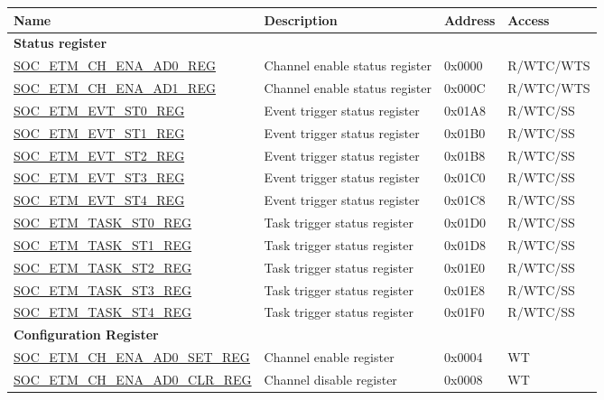 \begin{longtable}{ | p{6cm} | p{6.2cm} | p{1.3cm} | p{2cm} | }
\hline\rowcolor{lightgray}
\textbf{Name} & \textbf{Description} &  \textbf{Address} & \textbf{Access} \\ \hline
\endhead
\multicolumn{4}{|l|}{\textbf{Status register}} \\ \hline
\hyperref[regdesc:SOCETMCHENAAD0REG]{SOC\_ETM\_CH\_ENA\_AD0\_REG} & Channel enable status register & 0x0000 & R/WTC/WTS \\ \hline
\hyperref[regdesc:SOCETMCHENAAD1REG]{SOC\_ETM\_CH\_ENA\_AD1\_REG} & Channel enable status register & 0x000C & R/WTC/WTS \\ \hline
\hyperref[regdesc:SOCETMEVTST0REG]{SOC\_ETM\_EVT\_ST0\_REG} & Event trigger status register & 0x01A8 & R/WTC/SS \\ \hline
\hyperref[regdesc:SOCETMEVTST1REG]{SOC\_ETM\_EVT\_ST1\_REG} & Event trigger status register & 0x01B0 & R/WTC/SS \\ \hline
\hyperref[regdesc:SOCETMEVTST2REG]{SOC\_ETM\_EVT\_ST2\_REG} & Event trigger status register & 0x01B8 & R/WTC/SS \\ \hline
\hyperref[regdesc:SOCETMEVTST3REG]{SOC\_ETM\_EVT\_ST3\_REG} & Event trigger status register & 0x01C0 & R/WTC/SS \\ \hline
\hyperref[regdesc:SOCETMEVTST4REG]{SOC\_ETM\_EVT\_ST4\_REG} & Event trigger status register & 0x01C8 & R/WTC/SS \\ \hline
\hyperref[regdesc:SOCETMTASKST0REG]{SOC\_ETM\_TASK\_ST0\_REG} & Task trigger status register & 0x01D0 & R/WTC/SS \\ \hline
\hyperref[regdesc:SOCETMTASKST1REG]{SOC\_ETM\_TASK\_ST1\_REG} & Task trigger status register & 0x01D8 & R/WTC/SS \\ \hline
\hyperref[regdesc:SOCETMTASKST2REG]{SOC\_ETM\_TASK\_ST2\_REG} & Task trigger status register & 0x01E0 & R/WTC/SS \\ \hline
\hyperref[regdesc:SOCETMTASKST3REG]{SOC\_ETM\_TASK\_ST3\_REG} & Task trigger status register & 0x01E8 & R/WTC/SS \\ \hline
\hyperref[regdesc:SOCETMTASKST4REG]{SOC\_ETM\_TASK\_ST4\_REG} & Task trigger status register & 0x01F0 & R/WTC/SS \\ \hline
\multicolumn{4}{|l|}{\textbf{Configuration Register}} \\ \hline
\hyperref[regdesc:SOCETMCHENAAD0SETREG]{SOC\_ETM\_CH\_ENA\_AD0\_SET\_REG} & Channel enable register & 0x0004 & WT \\ \hline
\hyperref[regdesc:SOCETMCHENAAD0CLRREG]{SOC\_ETM\_CH\_ENA\_AD0\_CLR\_REG} & Channel disable register & 0x0008 & WT \\ \hline

\end{longtable}
